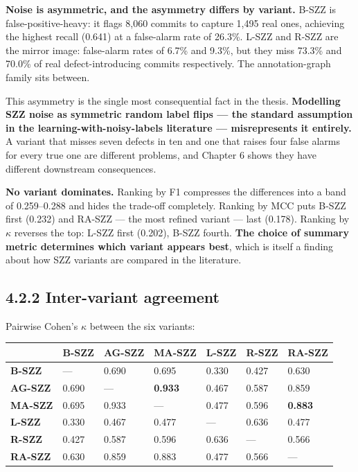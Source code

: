 \textbf{Noise is asymmetric, and the asymmetry differs by variant.}
B-SZZ is false-positive-heavy: it flags 8,060 commits to capture 1,495
real ones, achieving the highest recall (0.641) at a false-alarm rate of
26.3\%. L-SZZ and R-SZZ are the mirror image: false-alarm rates of 6.7\%
and 9.3\%, but they miss 73.3\% and 70.0\% of real defect-introducing
commits respectively. The annotation-graph family sits between.

This asymmetry is the single most consequential fact in the thesis.
\textbf{Modelling SZZ noise as symmetric random label flips --- the
standard assumption in the learning-with-noisy-labels literature ---
misrepresents it entirely.} A variant that misses seven defects in ten
and one that raises four false alarms for every true one are different
problems, and Chapter 6 shows they have different downstream
consequences.

\textbf{No variant dominates.} Ranking by F1 compresses the differences
into a band of 0.259--0.288 and hides the trade-off completely. Ranking
by MCC puts B-SZZ first (0.232) and RA-SZZ --- the most refined variant
--- last (0.178). Ranking by \ensuremath{\kappa} reverses the top: L-SZZ first (0.202),
B-SZZ fourth. \textbf{The choice of summary metric determines which
variant appears best}, which is itself a finding about how SZZ variants
are compared in the literature.

\subsection{4.2.2 Inter-variant
agreement}\label{inter-variant-agreement}

Pairwise Cohen's \ensuremath{\kappa} between the six variants:

\begin{longtable}[]{@{}lllllll@{}}
\toprule\noalign{}
& B-SZZ & AG-SZZ & MA-SZZ & L-SZZ & R-SZZ & RA-SZZ \\
\midrule\noalign{}
\endhead
\bottomrule\noalign{}
\endlastfoot
\textbf{B-SZZ} & --- & 0.690 & 0.695 & 0.330 & 0.427 & 0.630 \\
\textbf{AG-SZZ} & 0.690 & --- & \textbf{0.933} & 0.467 & 0.587 &
0.859 \\
\textbf{MA-SZZ} & 0.695 & 0.933 & --- & 0.477 & 0.596 &
\textbf{0.883} \\
\textbf{L-SZZ} & 0.330 & 0.467 & 0.477 & --- & 0.636 & 0.477 \\
\textbf{R-SZZ} & 0.427 & 0.587 & 0.596 & 0.636 & --- & 0.566 \\
\textbf{RA-SZZ} & 0.630 & 0.859 & 0.883 & 0.477 & 0.566 & --- \\
\end{longtable}

